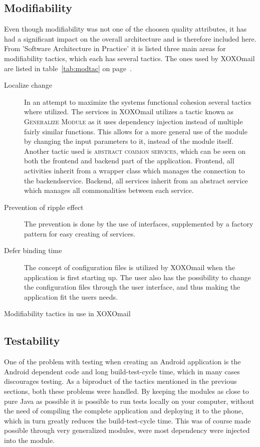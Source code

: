	\subsection{Modifiability}
		Even though modifiability was not one of the choosen quality attributes, it has had a significant impact on the overall architecture and is therefore included here. From 'Software Architecture in Practice'\cite[p. 111]{bib:archi} it is listed three main areas for modifiability tactics, which each has several tactics. The ones used by XOXOmail are listed in table~\ref{tab:modtac} on page~\pageref{tab:modtac}.
		\begin{table}[H]
			\begin{description}
				\item[Localize change] In an attempt to maximize the systems functional cohesion several tactics where utilized. The services in XOXOmail utilizes a tactic known as \textsc{Generalize Module} as it uses dependency injection instead of multiple fairly similar functions. This allows for a more general use of the module by changing the input parameters to it, instead of the module itself. Another tactic used is \textsc{abstract common services}, which can be seen on both the frontend and backend part of the application. Frontend, all activities inherit from a wrapper class which manages the connection to the backendservice. Backend, all services inherit from an abstract service which manages all commonalities between each service. 
				\item[Prevention of ripple effect] The prevention is done by the use of interfaces, supplemented by a factory pattern for easy creating of services. 
				\item[Defer binding time] The concept of configuration files is utilized by XOXOmail when the application is first starting up. The user also has the possibility to change the configuration files through the user interface, and thus making the application fit the users needs. 
			\end{description}
			\caption{Modifiability tactics in use in XOXOmail}
			\label{tab:modtac}
		\end{table}
		
	\subsection{Testability}
		One of the problem with testing when creating an Android application is the Android dependent code and long build-test-cycle time, which in many cases discourages testing. As a biproduct of the tactics mentioned in the previous sections, both these problems were handled. By keeping the modules as close to pure Java as possible it is possible to run tests locally on your computer, without the need of compiling the complete application and deploying it to the phone, which in turn greatly reduces the build-test-cycle time. This was of course made possible through very generalized modules, were most dependency were injected into the module. 
		
